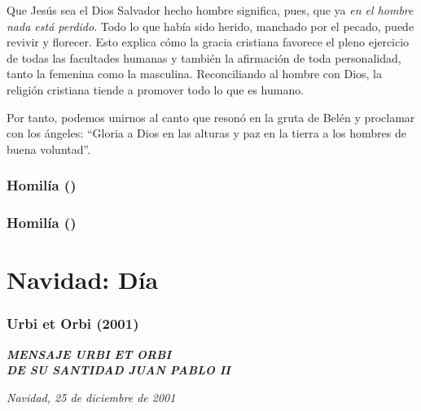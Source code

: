 Que Jesús sea el Dios Salvador hecho hombre significa, pues, que ya
\emph{en el hombre nada está perdido}. Todo lo que había sido herido,
manchado por el pecado, puede revivir y florecer. Esto explica cómo la
gracia cristiana favorece el pleno ejercicio de todas las facultades
humanas y también la afirmación de toda personalidad, tanto la femenina
como la masculina. Reconciliando al hombre con Dios, la religión
cristiana tiende a promover todo lo que es humano.

Por tanto, podemos unirnos al canto que resonó en la gruta de Belén y
proclamar con los ángeles: ``Gloria a Dios en las alturas y paz en la
tierra a los hombres de buena voluntad''.

\subsubsection{Homilía ()}

\subsubsection{Homilía ()}

\section{Navidad: Día}
\subsubsection{Urbi et Orbi (2001)}
\textbf{\emph{MENSAJE URBI ET ORBI\\
		DE SU SANTIDAD JUAN PABLO II}}

\emph{Navidad, 25 de diciembre de 2001}

~

